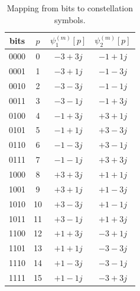 \documentclass[onecolumn, 11pt, draftclsnofoot]{IEEEtran}
\begin{document}
\begin{table}[!t]
  \renewcommand{\arraystretch}{1.3}
  \caption{Mapping from bits to constellation symbols.}
  \label{table:mapping}
  \centering
  \begin{tabular}{c|c|c|c}
    \hline
     bits & $p$ & $\psi_1^{(m)}[p]$ & $\psi_2^{(m)}[p]$  \\
    \hline
    0000 & 0 & $-3+3j$ & $-1+1j$ \\
    0001 & 1 & $-3+1j$ & $-1-3j$ \\
    0010 & 2 & $-3-3j$ & $-1-1j$ \\
    0011 & 3 & $-3-1j$ & $-1+3j$ \\
    0100 & 4 & $-1+3j$ & $+3+1j$ \\
    0101 & 5 & $-1+1j$ & $+3-3j$ \\
    0110 & 6 & $-1-3j$ & $+3-1j$ \\
    0111 & 7 & $-1-1j$ & $+3+3j$ \\
    1000 & 8 & $+3+3j$ & $+1+1j$ \\
    1001 & 9 & $+3+1j$ & $+1-3j$ \\
    1010 & 10 & $+3-3j$ & $+1-1j$ \\
    1011 & 11 & $+3-1j$ & $+1+3j$ \\
    1100 & 12 & $+1+3j$ & $-3+1j$ \\
    1101 & 13 & $+1+1j$ & $-3-3j$ \\
    1110 & 14 & $+1-3j$ & $-3-1j$ \\
    1111 & 15 & $+1-1j$ & $-3+3j$ \\
    \hline
  \end{tabular}
\end{table}
\end{document}
